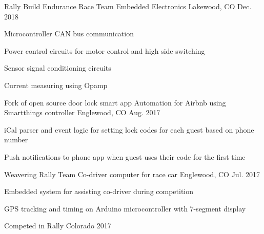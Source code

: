 

\begin{cventries}

  \cventry
    {Rally Build Endurance Race Team}
    {Embedded Electronics}
    {Lakewood, CO} %
    {Dec. 2018} %
    {
      \begin{cvitems} %
        \item {Microcontroller CAN bus communication}
        \item {Power control circuits for motor control and high side switching}
        \item {Sensor signal conditioning circuits}
        \item {Current measuring using Opamp}
      \end{cvitems}
    }

  \cventry
    {Fork of open source door lock smart app}
    {Automation for Airbnb using Smartthings controller}
    {Englewood, CO} %
    {Aug. 2017} %
    {
      \begin{cvitems} %
        \item {iCal parser and event logic for setting lock codes for each guest based on phone number}
        \item {Push notifications to phone app when guest uses their code for the first time}
      \end{cvitems}
    }

  \cventry
    {Weavering Rally Team}
    {Co-driver computer for race car}
    {Englewood, CO} %
    {Jul. 2017} %
    {
      \begin{cvitems} %
        \item {Embedded system for assisting co-driver during competition}
        \item {GPS tracking and timing on Arduino microcontroller with 7-segment display}
        \item {Competed in Rally Colorado 2017}
      \end{cvitems}
    }


\end{cventries}
